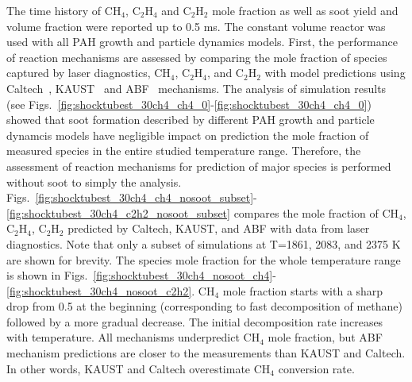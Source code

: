  The time history of $\mathrm{CH_4}$, $\mathrm{C_2H_4}$ and $\mathrm{C_2H_2}$ mole fraction as well as soot yield and volume fraction were reported up to 0.5 ms. The constant volume reactor was used with all PAH growth and particle dynamics models. First, the performance of reaction mechanisms are assessed by comparing the mole fraction of species captured by laser diagnostics, $\mathrm{CH_4}$, $\mathrm{C_2H_4}$, and $\mathrm{C_2H_2}$ with model predictions using Caltech~\citep{blanquart2009chemical}, KAUST~\cite{wang2013pah} and ABF~\citep{appel2000kinetic} mechanisms. The analysis of simulation results (see Figs.~\ref{fig:shocktubest_30ch4_ch4_0}-\ref{fig:shocktubest_30ch4_ch4_0}) showed that soot formation described by different PAH growth and particle dynamcis models have negligible impact on prediction the mole fraction of measured species in the entire studied temperature range. Therefore, the assessment of reaction mechanisms for prediction of major species is performed without soot to simply the analysis. Figs.~\ref{fig:shocktubest_30ch4_ch4_nosoot_subset}-\ref{fig:shocktubest_30ch4_c2h2_nosoot_subset} compares the mole fraction of $\mathrm{CH_4}$, $\mathrm{C_2H_4}$, $\mathrm{C_2H_2}$ predicted by Caltech, KAUST, and ABF with data from laser diagnostics. Note that only a subset of simulations at T=1861, 2083, and 2375 K are shown for brevity. The species mole fraction for the whole temperature range is shown in Figs.~\ref{fig:shocktubest_30ch4_nosoot_ch4}-\ref{fig:shocktubest_30ch4_nosoot_c2h2}. $\mathrm{CH_4}$ mole fraction starts with a sharp drop from 0.5 at the beginning (corresponding to fast decomposition of methane) followed by a more gradual decrease. The initial decomposition rate increases with temperature. All mechanisms underpredict $\mathrm{CH_4}$ mole fraction, but ABF mechanism predictions are closer to the measurements than KAUST and Caltech. In other words, KAUST and Caltech overestimate $\mathrm{CH_4}$ conversion rate.
